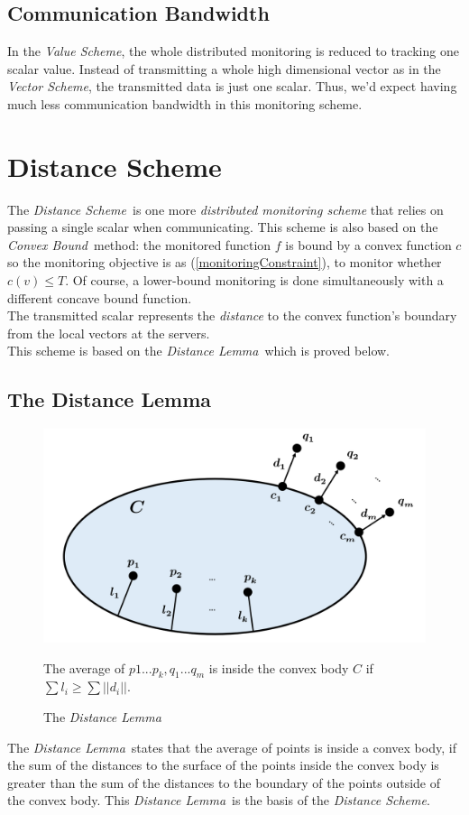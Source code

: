 \documentclass[10pt, conference]{IEEEtran}
\newcommand{\vectorScheme}{\textit{Vector Scheme}}
\newcommand{\valueScheme}{\textit{Value Scheme}}
\newcommand{\distanceScheme}{\textit{Distance Scheme}}
\newcommand{\distanceLemma}{\textit{Distance Lemma}}
\newcommand{\convexBound}{\textit{Convex Bound}}
\begin{document}
\subsection{Communication Bandwidth}
In the \valueScheme , the whole distributed monitoring is reduced to tracking one scalar value. Instead of transmitting a whole high dimensional vector as in the \vectorScheme , the transmitted data is just one scalar. Thus, we'd expect having much less communication bandwidth in this monitoring scheme.

\section{Distance Scheme}
The \distanceScheme \ is one more \textit{distributed monitoring scheme} that relies on passing a single scalar when communicating. This scheme is also based on the \convexBound \ method: the monitored function $f$ is bound by a convex function $c$ so the monitoring objective is as (\ref{monitoringConstraint}), to monitor whether ${c(v) \leq T}$. Of course, a lower-bound monitoring is done simultaneously with a different concave bound function. \\
The transmitted scalar represents the \textit{distance} to the convex function's boundary from the local vectors at the servers. \\
This scheme is based on the \distanceLemma \ which is proved below.
\subsection{The Distance Lemma}
\begin{figure}[b]
\begin{center}
\includegraphics[width=0.9\linewidth]{Pics/PNGs/DistanceLemma.png}
\end{center}
{\centering
\caption{The \distanceLemma}}
\medskip
\small
The average of ${p1...p_k, q_1...q_m}$ is inside the convex body $C$ if ${\sum l_i \geq \sum ||d_i||}$.
\end{figure}
The \distanceLemma \ states that the average of points is inside a convex body, if the sum of the distances to the surface of the points inside the convex body is greater than the sum of the distances to the boundary of the points outside of the convex body. This \distanceLemma \ is the basis of the \distanceScheme . \\
\end{document}
